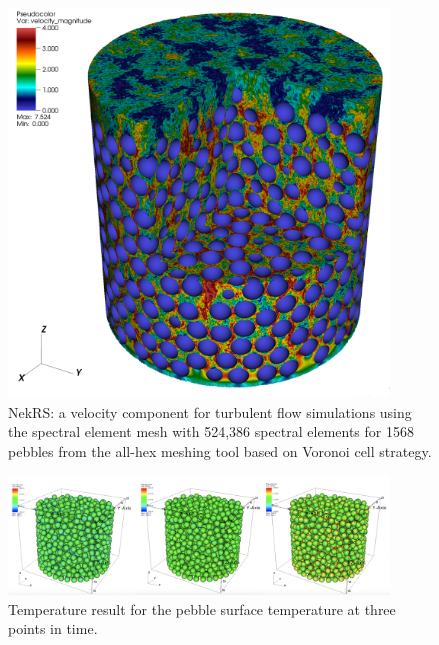 \begin{figure}[!h]
\centering
\includegraphics[clip=true,width=0.9\textwidth]{Figures/ndemo_r3}
\caption{NekRS: a velocity component for turbulent flow simulations using the
spectral element mesh with 524,386 spectral elements for 1568 pebbles from the
all-hex meshing tool based on Voronoi cell strategy. }
\label{f:ndemo3}
\end{figure}


\begin{figure}[!h]
\centering
\includegraphics[clip=true,width=0.9\textwidth]{Figures/ndemo_r4}
\caption{Temperature result for the pebble surface temperature at three points in time.}
\label{f:ndemo4}
\end{figure}


